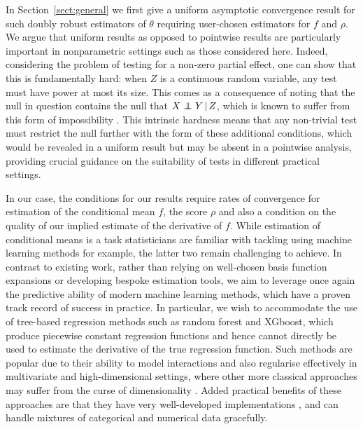 \documentclass[aos]{imsart}
\newcommand{\given}{\,|\,}
\newcommand{\independent}{\mbox{${}\perp\mkern-11mu\perp{}$}}
\begin{document}
		In Section~\ref{sect:general} we first give a uniform asymptotic convergence result for such doubly robust estimators of $\theta$ requiring user-chosen estimators for $f$ and $\rho$. We argue that uniform results as opposed to pointwise results are particularly important in nonparametric settings such as those considered here. Indeed, considering the problem of testing for a non-zero partial effect, one can show that this is fundamentally hard: when $Z$ is a continuous random variable, any test must have power at most its size. This comes as a consequence of noting that the null in question contains the null that $X \independent Y \given Z$, which is known to suffer from this form of impossibility \citep[Thm.~2]{ShahGCM}. This intrinsic hardness means that any non-trivial test must restrict the null further with the form of these additional conditions, which would be revealed in a uniform result but may be absent in a pointwise analysis, providing crucial guidance on the suitability of tests in different practical settings.
		
		In our case, the conditions for our results require rates of convergence for estimation of the conditional mean $f$, the score $\rho$ and also a condition on the quality of our implied estimate of the derivative of $f$. While estimation of conditional means is a task statisticians are familiar with tackling using machine learning methods for example, 
		the latter two remain challenging to achieve. In contrast to existing work, rather than relying on well-chosen basis function expansions or developing bespoke estimation tools, we aim to leverage once again the predictive ability of modern machine learning methods, which have a proven track record of success in practice. In particular, we wish to accommodate the use of tree-based regression methods such as random forest and XGboost, which produce piecewise constant regression functions and hence cannot directly be used to estimate the derivative of the true regression function. Such methods are popular due to their ability to model interactions and also regularise effectively in multivariate and high-dimensional settings, where other more classical approaches may suffer from the curse of dimensionality \citep{hastie2009elements}. Added practical benefits of these approaches are that they have very well-developed implementations \citep{wright2017ranger,xgboost}, and can handle mixtures of categorical and numerical data gracefully.
		
\end{document}
